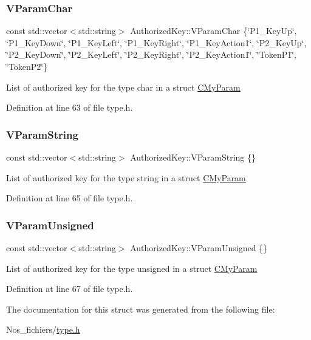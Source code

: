 \subsubsection{\texorpdfstring{V\+Param\+Char}{VParamChar}}
{\footnotesize\ttfamily const std\+::vector$<$std\+::string$>$ Authorized\+Key\+::\+V\+Param\+Char \{\char`\"{}P1\+\_\+\+Key\+Up\char`\"{}, \char`\"{}P1\+\_\+\+Key\+Down\char`\"{}, \char`\"{}P1\+\_\+\+Key\+Left\char`\"{}, \char`\"{}P1\+\_\+\+Key\+Right\char`\"{}, \char`\"{}P1\+\_\+\+Key\+Action1\char`\"{}, \char`\"{}P2\+\_\+\+Key\+Up\char`\"{}, \char`\"{}P2\+\_\+\+Key\+Down\char`\"{}, \char`\"{}P2\+\_\+\+Key\+Left\char`\"{}, \char`\"{}P2\+\_\+\+Key\+Right\char`\"{}, \char`\"{}P2\+\_\+\+Key\+Action1\char`\"{}, \char`\"{}Token\+P1\char`\"{}, \char`\"{}Token\+P2\char`\"{}\}}

List of authorized key for the type char in a struct \hyperlink{struct_c_my_param}{C\+My\+Param} 

Definition at line 63 of file type.\+h.

\mbox{\label{struct_authorized_key_a14d2cbd0e3dcc77a793a55f988d78b73}} 
\subsubsection{\texorpdfstring{V\+Param\+String}{VParamString}}
{\footnotesize\ttfamily const std\+::vector$<$std\+::string$>$ Authorized\+Key\+::\+V\+Param\+String \{\}}

List of authorized key for the type string in a struct \hyperlink{struct_c_my_param}{C\+My\+Param} 

Definition at line 65 of file type.\+h.

\mbox{\label{struct_authorized_key_a871173f4b0c89c91289a10f0ddc1cadd}} 
\subsubsection{\texorpdfstring{V\+Param\+Unsigned}{VParamUnsigned}}
{\footnotesize\ttfamily const std\+::vector$<$std\+::string$>$ Authorized\+Key\+::\+V\+Param\+Unsigned \{\}}

List of authorized key for the type unsigned in a struct \hyperlink{struct_c_my_param}{C\+My\+Param} 

Definition at line 67 of file type.\+h.



The documentation for this struct was generated from the following file\+:\begin{DoxyCompactItemize}
\item 
Nos\+\_\+fichiers/\hyperlink{type_8h}{type.\+h}\end{DoxyCompactItemize}
